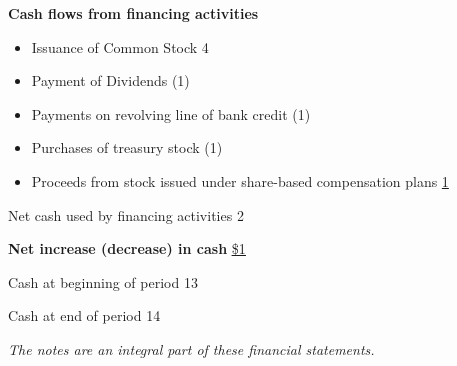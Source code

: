 \begin{tcolorbox}[colframe=black,colback=white,title=Example Statement of Cash Flow]
    \textbf{Cash flows from financing activities}
    \begin{itemize}[label={}, leftmargin=*]
        \item Issuance of Common Stock \hfill 4
        \item Payment of Dividends \hfill (1)
        \item Payments on revolving line of bank credit \hfill (1)
        \item Purchases of treasury stock \hfill (1)
        \item Proceeds from stock issued under share-based compensation plans \hfill \underline{1}
    \end{itemize}
    Net cash used by financing activities \hfill 2

    \textbf{Net increase (decrease) in cash} \hfill \underline{\underline{\$1}}

    Cash at beginning of period \hfill 13

    Cash at end of period \hfill 14

    \vspace{1em}

    \textit{\footnotesize{The notes are an integral part of these financial statements.}}
\end{tcolorbox}
\newpage
